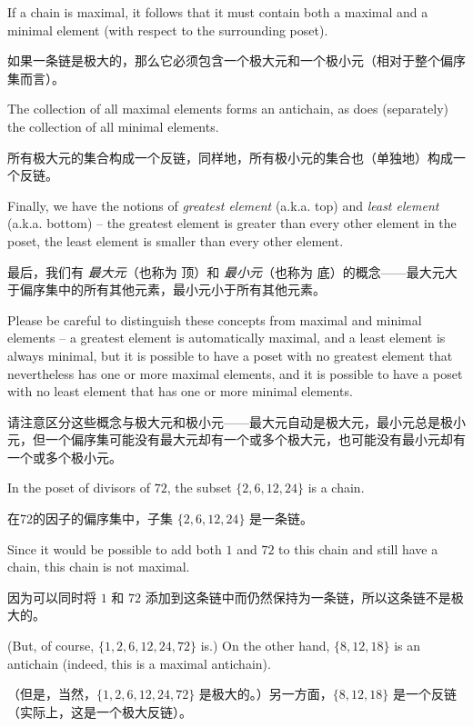 If a chain is maximal, it follows that it
must contain both a maximal and a minimal element (with respect to the
surrounding poset).

如果一条链是极大的，那么它必须包含一个极大元和一个极小元（相对于整个偏序集而言）。

The collection of all maximal elements forms an antichain,
as does (separately) the collection of all minimal elements.

所有极大元的集合构成一个反链，同样地，所有极小元的集合也（单独地）构成一个反链。

Finally,
we have the notions of  
\emph{greatest element} (a.k.a. top) and 
\emph{least element} (a.k.a. 
bottom) -- the greatest element is greater than every
other element in the poset,  the least element is smaller than every other element.

最后，我们有 \emph{最大元}（也称为 顶）和 \emph{最小元}（也称为 底）的概念——最大元大于偏序集中的所有其他元素，最小元小于所有其他元素。

Please be careful to distinguish these
concepts from maximal and minimal elements -- a greatest element is 
automatically maximal, and a least element is always minimal, but it 
is possible to have a poset with no greatest element that nevertheless 
has one or more maximal elements, and it is possible to have a poset with no
least element that has one or more minimal elements.

请注意区分这些概念与极大元和极小元——最大元自动是极大元，最小元总是极小元，但一个偏序集可能没有最大元却有一个或多个极大元，也可能没有最小元却有一个或多个极小元。

In the poset of divisors of $72$, the subset $\{2, 6, 12, 24\}$ is a chain.

在72的因子的偏序集中，子集 $\{2, 6, 12, 24\}$ 是一条链。

Since it would be possible to add both $1$ and $72$ to this chain and still 
have a chain, this chain is not maximal.

因为可以同时将 $1$ 和 $72$ 添加到这条链中而仍然保持为一条链，所以这条链不是极大的。

(But, of course, 
$\{1, 2, 6, 12, 24, 72\}$ is.)  On the other hand, 
$\{8, 12, 18\}$ is an antichain (indeed, this is a maximal antichain).

（但是，当然，$\{1, 2, 6, 12, 24, 72\}$ 是极大的。）另一方面，$\{8, 12, 18\}$ 是一个反链（实际上，这是一个极大反链）。

